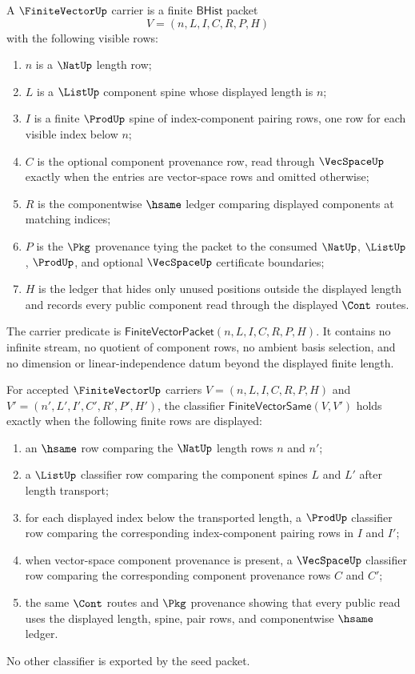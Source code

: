\begin{definition}
\label{def:finitevector-carrier}
A $\FiniteVectorUp$ carrier is a finite $\mathsf{BHist}$ packet
$$
V=(n,L,I,C,R,P,H)
$$
with the following visible rows:
\begin{enumerate}
\item $n$ is a $\NatUp$ length row;
\item $L$ is a $\ListUp$ component spine whose displayed length is $n$;
\item $I$ is a finite $\ProdUp$ spine of index-component pairing rows, one row for each visible index below $n$;
\item $C$ is the optional component provenance row, read through $\VecSpaceUp$ exactly when the entries are vector-space rows and omitted otherwise;
\item $R$ is the componentwise $\hsame$ ledger comparing displayed components at matching indices;
\item $P$ is the $\Pkg$ provenance tying the packet to the consumed $\NatUp$, $\ListUp$, $\ProdUp$, and optional $\VecSpaceUp$ certificate boundaries;
\item $H$ is the ledger that hides only unused positions outside the displayed length and records every public component read through the displayed $\Cont$ routes.
\end{enumerate}
The carrier predicate is $\mathsf{FiniteVectorPacket}(n,L,I,C,R,P,H)$. It contains no infinite stream, no quotient of component rows, no ambient basis selection, and no dimension or linear-independence datum beyond the displayed finite length.
\end{definition}

\begin{definition}
\label{def:finitevector-classifier}
For accepted $\FiniteVectorUp$ carriers $V=(n,L,I,C,R,P,H)$ and $V'=(n',L',I',C',R',P',H')$, the classifier $\mathsf{FiniteVectorSame}(V,V')$ holds exactly when the following finite rows are displayed:
\begin{enumerate}
\item an $\hsame$ row comparing the $\NatUp$ length rows $n$ and $n'$;
\item a $\ListUp$ classifier row comparing the component spines $L$ and $L'$ after length transport;
\item for each displayed index below the transported length, a $\ProdUp$ classifier row comparing the corresponding index-component pairing rows in $I$ and $I'$;
\item when vector-space component provenance is present, a $\VecSpaceUp$ classifier row comparing the corresponding component provenance rows $C$ and $C'$;
\item the same $\Cont$ routes and $\Pkg$ provenance showing that every public read uses the displayed length, spine, pair rows, and componentwise $\hsame$ ledger.
\end{enumerate}
No other classifier is exported by the seed packet.
\end{definition}

